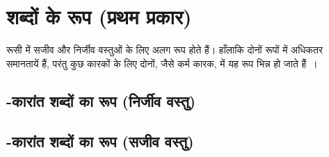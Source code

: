 \section{शब्दों के रूप (प्रथम प्रकार)}\label{sec:noun-endings-first-declension}
रूसी में सजीव और निर्जीव वस्तुओं के लिए अलग रूप होते हैं। हाँलाकि दोनों रूपों में अधिकतर समानतायें हैं, परंतु कुछ कारकों के लिए दोनों, जैसे कर्म कारक, में यह
रूप भिन्न हो जाते हैं~\cite{readyruss2021}।

\subsection{-कारांत शब्दों का रूप (निर्जीव वस्तु)}\label{subsec:noun-endings-first-declension-hard-inanimate-male}

\subsection{-कारांत शब्दों का रूप (सजीव वस्तु)}\label{subsec:noun-endings-first-declension-hard-animate-male}

